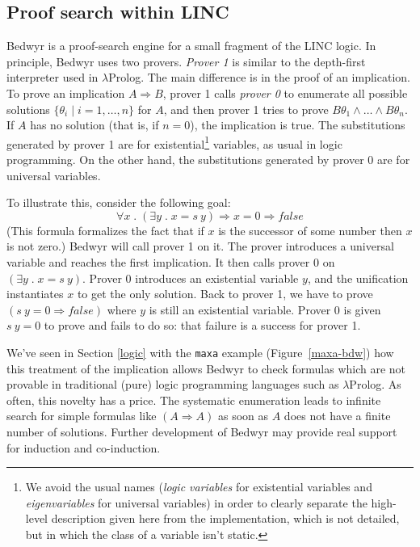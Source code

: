 \documentclass{article}
\newcommand{\lp}{$\lambda$Prolog}
\newcommand{\qs}{\; . \;}
\begin{document}
\subsection{Proof search within LINC}
\label{psearch}

Bedwyr is a proof-search engine for a small fragment of the LINC
logic.  In principle, Bedwyr uses two provers.  {\em Prover 1} is similar to
the depth-first interpreter used in \lp{}.  The main
difference is in the proof of an implication.
To prove an implication $A\Rightarrow B$, prover 1  calls {\em prover 0}
to enumerate all possible solutions
$\{\theta_i\;|\;i=1,\ldots,n\}$ for $A$,
and then prover 1 tries to prove $B\theta_1\wedge\dots\wedge B\theta_n$.
If $A$ has no solution (that is, if $n=0$), the implication is true.
The substitutions generated by prover 1 are for existential\footnote{
We avoid the usual names (\emph{logic variables} for existential variables and
\emph{eigenvariables} for universal variables) in order to clearly separate the
high-level description given here from the implementation, which is not
detailed, but in which the class of a variable isn't static.}
variables, as usual in logic programming.
On the other hand, the substitutions generated by prover 0 are for
universal variables.

To illustrate this,
consider the following goal:
\[ \forall x \qs (\exists y \qs x=s~y) \Rightarrow x=0 \Rightarrow false \]
(This formula formalizes the fact that if $x$ is the successor of some
number then $x$ is not zero.)
Bedwyr will call prover 1 on it. The prover introduces a universal variable
and reaches the first implication.
It then calls prover 0 on $(\exists y \qs x = s~y)$.
Prover 0 introduces an existential variable $y$,
and the unification instantiates $x$ to get the only solution.
Back to prover 1, we have to prove $(s~y = 0 \Rightarrow false)$
where $y$ is still an existential variable. Prover 0 is given $s~y=0$
to prove and fails to do so: that failure is a success for prover 1.

We've seen in Section \ref{logic} with the \verb.maxa. example
(Figure~\ref{maxa-bdw}) how this treatment of the implication allows
Bedwyr to check formulas which are not provable in traditional (pure) logic
programming languages such as \lp{}.
As often, this novelty has a price. The systematic enumeration leads to
infinite search for simple formulas like $(A \Rightarrow A)$ as soon as
$A$ does not have a finite number of solutions.
Further development of Bedwyr may provide
real support for induction and co-induction.
\end{document}
